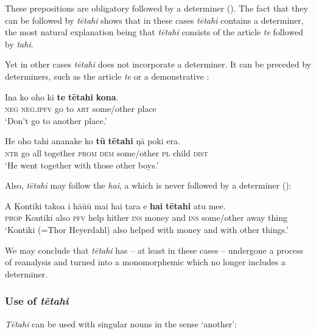 These prepositions are obligatory followed by a determiner (). The fact that they can be followed by \textit{tētahi} shows that in these cases \textit{tētahi} contains a determiner, the most natural explanation being that \textit{tētahi} consists of the article \textit{te} followed by \textit{tahi}.

Yet in other cases \textit{tētahi} does not incorporate a determiner. It can be preceded by determiners, such as the article \textit{te}  or a demonstrative :

\ea\label{ex:4.80}
\gll {\ꞌ}Ina ko oho ki \textbf{te} \textbf{tētahi} \textbf{kona}. \\
\textsc{neg} \textsc{neg.ipfv} go to \textsc{art} some/other place \\

\glt 
‘Don’t go to another place.’ \textstyleExampleref{[R481.135]} 
\z

\ea\label{ex:4.81}
\gll He oho tahi ananake ko \textbf{tū} \textbf{tētahi} ŋā poki era. \\
\textsc{ntr} go all together \textsc{prom} \textsc{dem} some/other \textsc{pl} child \textsc{dist} \\

\glt
‘He went together with those other boys.’ \textstyleExampleref{[R161.027]} 
\z

Also, \textit{tētahi} may follow the  \textit{hai}, a  which is never followed by a determiner ():

\ea\label{ex:4.82}
\gll A Kontiki tako{\ꞌ}a i hā{\ꞌ}ū{\ꞌ}ū mai hai tara {\ꞌ}e \textbf{hai} \textbf{tētahi} atu me{\ꞌ}e. \\
\textsc{prop} Kontiki also \textsc{pfv} help hither \textsc{ins} money and \textsc{ins} some/other away thing \\

\glt
‘Kontiki (=Thor Heyerdahl) also helped with money and with other things.’ \textstyleExampleref{[R375.094]} 
\z

We may conclude that \textit{tētahi} has – at least in these cases – undergone a process of reanalysis and turned into a monomorphemic  which no longer includes a determiner. 

\subsubsection[Use of tētahi]{Use of \textit{tētahi}}\label{sec:4.4.6.2}
\textit{Tētahi} can be used with singular nouns in the sense ‘another’:

